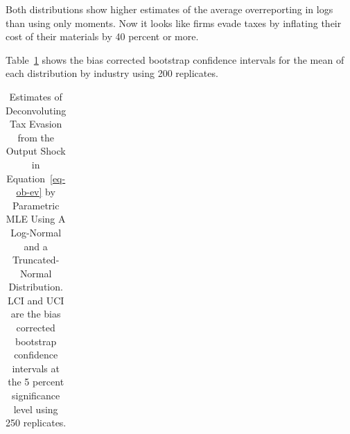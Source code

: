 \documentclass[
  12pt]{article}
\theoremstyle{definition}
\theoremstyle{remark}
\begin{document}
Both distributions show higher estimates of the average overreporting in
logs than using only moments. Now it looks like firms evade taxes by
inflating their cost of their materials by 40 percent or more.

Table~\ref{tbl-deconv-mle-boot} shows the bias corrected bootstrap
confidence intervals for the mean of each distribution by industry using
200 replicates.

\begin{longtable}[t]{llll}

\caption{\label{tbl-deconv-mle-boot}Estimates of Deconvoluting Tax
Evasion from the Output Shock in Equation~\ref{eq-ob-ev} by Parametric
MLE Using A Log-Normal and a Truncated-Normal Distribution. LCI and UCI
are the bias corrected bootstrap confidence intervals at the 5 percent
significance level using 250 replicates.}

\tabularnewline


\end{longtable}
\end{document}
